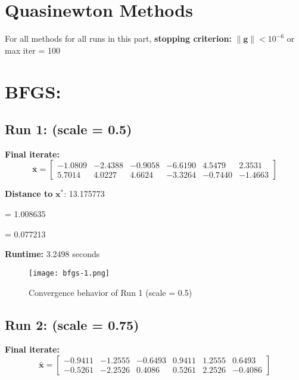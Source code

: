 \documentclass{article}
\begin{document}
\section*{Quasinewton Methods}

For all methods for all runs in this part, \textbf{stopping criterion:} $\|\mathbf{g}\| < 10^{-6}$ or max iter = 100

\section*{BFGS:}

\subsection*{Run 1: (scale = 0.5)}
\vspace{1em}

\textbf{Final iterate:}
\[
\bar{\mathbf{x}} =
\begin{bmatrix}
-1.0809 & -2.4388 & -0.9058 & -6.6190 & 4.5479 & 2.3531 \\
5.7014 & 4.0227 & 4.6624 & -3.3264 & -0.7440 & -1.4663
\end{bmatrix}
\]

\vspace{0.5em}
\noindent
\textbf{Distance to } $\mathbf{x}^*$: 13.175773

\vspace{0.5em}
\noindent
{} = 1.008635

\noindent
{} = 0.077213

\vspace{0.5em}
\noindent
\textbf{Runtime:} 3.2498 seconds

\begin{figure}[H]
    \centering
    \texttt{[image: bfgs-1.png]}
    \caption{Convergence behavior of Run 1 (scale = 0.5)}
    \label{fig:run1}
\end{figure}



\subsection*{Run 2: (scale = 0.75)}
\vspace{1em}

\textbf{Final iterate:}
\[
\bar{\mathbf{x}} =
\begin{bmatrix}
-0.9411 & -1.2555 & -0.6493 & 0.9411 & 1.2555 & 0.6493 \\
-0.5261 & -2.2526 & 0.4086 & 0.5261 & 2.2526 & -0.4086
\end{bmatrix}
\]
\end{document}
